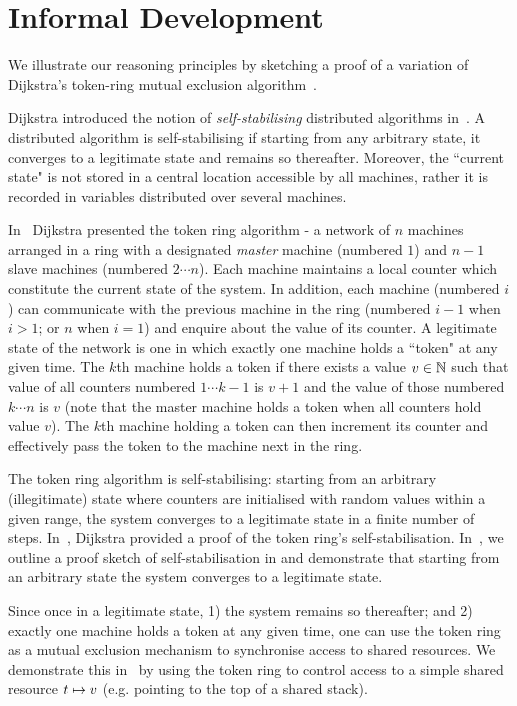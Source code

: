 \section{Informal Development}
\label{sec:intuition}

We illustrate our \colosl reasoning principles by sketching a proof of
a variation of Dijkstra's token-ring mutual exclusion
algorithm~\cite{dijkstra74}. 

Dijkstra introduced the notion of \emph{self-stabilising} distributed algorithms in~\cite{dijkstra74}. A distributed algorithm is self-stabilising if starting from any arbitrary state, it converges to a legitimate state and remains so thereafter. Moreover, the ``current state" is not stored in a central location accessible by all machines, rather it is recorded in variables distributed over several machines.
 
In~\cite{dijkstra74} Dijkstra presented the token ring algorithm - a network of $n$ machines arranged in a ring with a designated \emph{master} machine (numbered $1$) and $n-1$ slave machines (numbered $2 \cdots n$). Each machine maintains a local counter which constitute the current state of the system. 
In addition, each machine (numbered $i$) can communicate with the previous machine in the ring (numbered $i-1$ when $i>1$; or $n$ when $i=1$) and enquire about the value of its counter.
%
 A legitimate state of the network is one in which exactly one machine holds a ``token" at any given time. The $k$th machine holds a token if there exists a value $v \in \mathbb{N}$ such that value of all counters numbered $1\cdots k-1$ is $v+1$ and the value of those numbered $k\cdots n$ is $v$ (note that the master machine holds a token when all counters hold value $v$). The $k$th machine holding a token can then increment its counter and effectively pass the token to the machine next in the ring.
 
 The token ring algorithm is self-stabilising: starting from an arbitrary (illegitimate) state where counters are initialised with random values within a given range, the system converges to a legitimate state in a finite number of steps. In~\cite{dijkstra-proof}, Dijkstra provided a proof of the token ring's self-stabilisation. In~\cite{colosl-tr14}, we outline a proof sketch of self-stabilisation in \colosl and demonstrate that starting from an arbitrary state the system converges to a legitimate state.
 
Since once in a legitimate state, 1) the system remains so thereafter; and 2) exactly one machine holds a token at any given time, one can use the token ring as a mutual exclusion mechanism to synchronise access to shared resources. We demonstrate this in~\cite{colosl-tr14} by using the token ring to control access to a simple shared resource $t \mapsto v$ (e.g. pointing to the top of a shared stack). 


